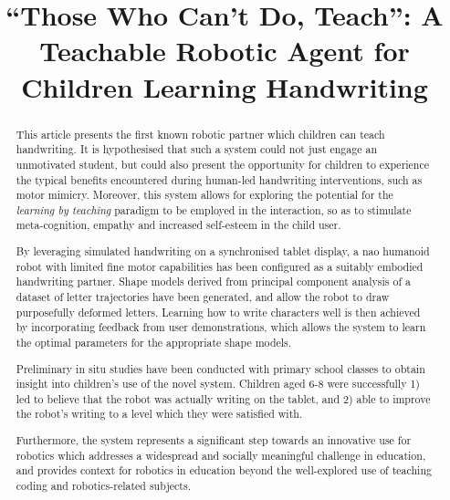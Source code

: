 \documentclass{sig-alternate}
\title{\LARGE \bf
``Those Who Can't Do, Teach'': A Teachable Robotic Agent for Children Learning Handwriting
}
\begin{document}
\maketitle

\begin{abstract}




This article presents the first known robotic partner which children can teach handwriting. It is
hypothesised that such a system could not just engage an unmotivated student,
but could also present the opportunity for children to experience the typical
benefits encountered during human-led handwriting interventions, such as motor
mimicry. Moreover, this system allows for exploring the potential for the
\emph{learning by teaching} paradigm to be employed in the interaction, so as to
stimulate meta-cognition, empathy and increased self-esteem in the child user. 

By leveraging simulated handwriting on a synchronised tablet display, a {\sc nao}
humanoid robot with limited fine motor capabilities has been configured as a
suitably embodied handwriting partner. Shape models derived from principal
component analysis of a dataset of letter trajectories have been generated, and allow
the robot to draw purposefully deformed letters. Learning how to write
characters well is then achieved by incorporating feedback from user
demonstrations, which allows the system to learn the optimal parameters for the
appropriate shape models. 

Preliminary in situ studies have been conducted with primary school classes to obtain
insight into children's use of the novel system. 
Children aged 6-8 were successfully 1) led to believe that the robot was
actually writing on the tablet, and 2) able to improve the robot's writing to a
level which they were satisfied with. 

Furthermore, the system represents a
significant step towards an innovative use for robotics which addresses a
widespread and socially meaningful challenge in education, and provides context
for robotics in education beyond the well-explored use of teaching coding and
robotics-related subjects.

\end{abstract}
\end{document}
